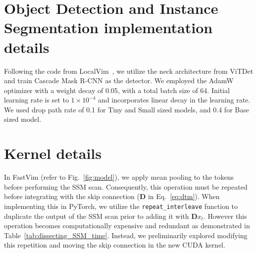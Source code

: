 \section{Object Detection and Instance Segmentation implementation details}
\label{additional_objectdet_implementation_section}

Following the code from LocalVim~\cite{huang2024localmamba}, we utilize the neck architecture from ViTDet and train Cascade Mask R-CNN as the detector. We employed the AdamW optimizer with a weight decay of 0.05, with a total batch size of 64. Initial learning rate is set to \(1 \times 10^{-4}\) and incorporates linear decay in the learning rate. We used drop path rate of 0.1 for Tiny and Small sized models, and 0.4 for Base sized model.


\section{Kernel details}
\label{kernel_details}

In FastVim (refer to Fig.~\ref{fig:model}), we apply mean pooling to the tokens before performing the SSM scan. Consequently, this operation must be repeated before integrating with the skip connection (\(\mathbf{D}\) in Eq.~\ref{eq:dtm}). When implementing this in PyTorch, we utilize the \texttt{repeat\_interleave} function to duplicate the output of the SSM scan prior to adding it with \(\mathbf{D} x_t\). However this operation becomes computationally expensive and redundant as demonstrated in Table~\ref{tab:dissecting_SSM_time}. Instead, we preliminarily explored modifying this repetition and moving the skip connection in the new CUDA kernel. 


\begin{table}[!h]
    \caption{Comparison of inference throughput analysis with our kernel versus default Mamba kernel on a H100 gpu. Autocast is set to False, and LayerNorm is added post-SSM, image resolution is 224, and batch size is set to 128.}
    \begin{center}
\end{center}
    \label{tab:throughput_with_kernel}
\end{table}

